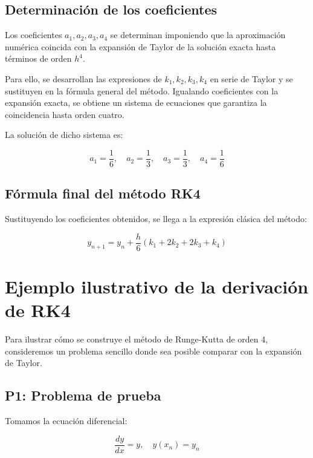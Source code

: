 \documentclass[12pt,a4paper]{article}
\begin{document}
\subsection{Determinación de los coeficientes}

Los coeficientes $a_1, a_2, a_3, a_4$ se determinan imponiendo que la aproximación numérica coincida con la expansión de Taylor de la solución exacta hasta términos de orden $h^4$.

Para ello, se desarrollan las expresiones de $k_1, k_2, k_3, k_4$ en serie de Taylor y se sustituyen en la fórmula general del método. Igualando coeficientes con la expansión exacta, se obtiene un sistema de ecuaciones que garantiza la coincidencia hasta orden cuatro.

La solución de dicho sistema es:

\begin{equation}
a_1 = \frac{1}{6}, \quad a_2 = \frac{1}{3}, \quad a_3 = \frac{1}{3}, \quad a_4 = \frac{1}{6}
\end{equation}

\subsection{Fórmula final del método RK4}

Sustituyendo los coeficientes obtenidos, se llega a la expresión clásica del método:

\begin{equation}
y_{n+1} = y_n + \frac{h}{6}\left(k_1 + 2k_2 + 2k_3 + k_4\right)
\end{equation}



\section{Ejemplo ilustrativo de la derivación de RK4}

Para ilustrar cómo se construye el método de Runge-Kutta de orden 4, consideremos un problema sencillo donde sea posible comparar con la expansión de Taylor.

\subsection*{P1: Problema de prueba}

Tomamos la ecuación diferencial:

\begin{equation}
\frac{dy}{dx} = y, \quad y(x_n)=y_n
\end{equation}
\end{document}
